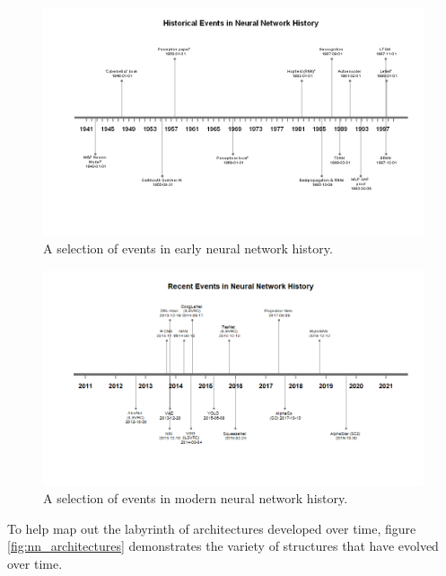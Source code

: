 \begin{figure}
    \centering
    \includegraphics[width=140mm,scale=1.5]{figs/timeline_old_nn.png}
    \caption{A selection of events in early neural network history.}
    \label{fig:timeline_old_nn}
\end{figure}

\begin{figure}
    \centering
    \includegraphics[width=140mm,scale=1.5]{figs/timeline_new_nn.png}
    \caption{A selection of events in modern neural network history.}
    \label{fig:timeline_new_nn}
\end{figure}


To help map out the labyrinth of architectures developed over time, figure \ref{fig:nn_architectures} demonstrates the variety of structures that have evolved over time.
\bigskip

